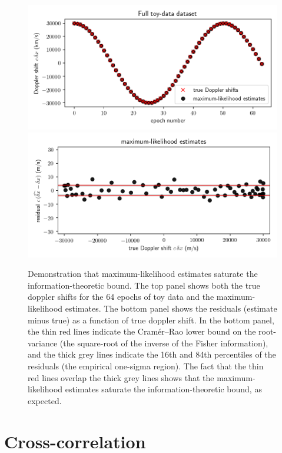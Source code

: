 \documentclass[modern]{aastex631}
\begin{document}
\begin{figure}[tp]
  \begin{mdframed}
    \begin{center}
    \includegraphics[width=\textwidth]{../notebook/full.png}
    \includegraphics[width=\textwidth]{../notebook/mlrvs.png}
    \end{center}
    \caption{Demonstration that maximum-likelihood estimates saturate the information-theoretic bound.
    The top panel shows both the true doppler shifts for the 64 epochs of toy data and the maximum-likelihood estimates.
    The bottom panel shows the residuals (estimate minus true) as a function of true doppler shift.
    In the bottom panel, the thin red lines indicate the Cram\'er--Rao lower bound on the root-variance (the square-root of the inverse of the Fisher information), and the thick grey lines indicate the 16th and 84th percentiles of the residuals (the empirical one-sigma region).
    The fact that the thin red lines overlap the thick grey lines shows that the maximum-likelihood estimates saturate the information-theoretic bound, as expected.\label{fig:mlrvs}}
  \end{mdframed}
\end{figure}

\section{Cross-correlation}\label{sec:ccf}
\end{document}
